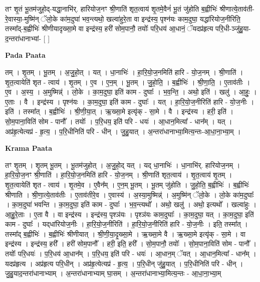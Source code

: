 \documentclass[17pt]{extarticle}
\begin{document}
तꣳ शृ॒तं भू॒तम॑जुहो॒द्-यद्धा॒नाभि॑र्. हारियोज॒नꣳ श्री॒णाति॑ शृत॒त्वाय॑ शृ॒तमे॒वैनं॑ भू॒तं जु॑होति ब॒ह्वीभिः॑ श्रीणात्ये॒ताव॑ती-रे॒वास्या॒-मुष्मि॑न् ॅलो॒के का॑म॒दुघा॑ भव॒न्त्यथो॒ खल्वा॑हुरे॒ता वा इन्द्र॑स्य॒ पृश्न॑यः काम॒दुघा॒ यद्धा॑रियोज॒नीरिति॒ तस्मा᳚द्-ब॒ह्वीभिः॑ श्रीणीयादृख्सा॒मे वा इन्द्र॑स्य॒ हरी॑ सोम॒पानौ॒ तयोः᳚ परि॒धय॑ आ॒धानं॒ ॅयदप्र॑हृत्य परि॒धी-ञ्जु॑हु॒या-द॒न्तरा॑धानाभ्यां- [  ] \newline

\textbf{Pada Paata} \newline

तम् । शृ॒तम् । भू॒तम् । अ॒जु॒हो॒त् । यत् । धा॒नाभिः॑ । हा॒रि॒यो॒ज॒नमिति॑ हारि - यो॒ज॒नम् । श्री॒णाति॑ । शृ॒त॒त्वायेति॑ शृत - त्वाय॑ । शृ॒तम् । ए॒व । ए॒न॒म् । भू॒तम् । जु॒हो॒ति॒ । ब॒ह्वीभिः॑ । श्री॒णा॒ति॒ । ए॒ताव॑तीः । ए॒व । अ॒स्य॒ । अ॒मुष्मिन्न्॑ । लो॒के । का॒म॒दुघा॒ इति॑ काम - दुघाः᳚ । भ॒व॒न्ति॒ । अथो॒ इति॑ । खलु॑ । आ॒हुः॒ । ए॒ताः । वै । इन्द्र॑स्य । पृश्न॑यः । का॒म॒दुघा॒ इति॑ काम - दुघाः᳚ । यत् । हा॒रि॒यो॒ज॒नीरिति॑ हारि - यो॒ज॒नीः । इति॑ । तस्मा᳚त् । ब॒ह्वीभिः॑ । श्री॒णी॒या॒त् । ऋ॒ख्सा॒मे इत्यृ॑क् - सा॒मे । वै । इन्द्र॑स्य । हरी॒ इति॑ । सो॒म॒पाना॒विति॑ सोम - पानौ᳚ । तयोः᳚ । प॒रि॒धय॒ इति॑ परि - धयः॑ । आ॒धान॒मित्या᳚ - धान᳚म् । यत् । अप्र॑हृ॒त्येत्यप्र॑ - हृ॒त्य॒ । प॒रि॒धीनिति॑ परि - धीन् । जु॒हु॒यात् । अ॒न्तरा॑धानाभ्या॒मित्य॒न्तः-आ॒धा॒ना॒भ्या॒म् ।  \newline


\textbf{Krama Paata} \newline

तꣳ शृ॒तम् । शृ॒तम् भू॒तम् । भू॒तम॑जुहोत् । अ॒जु॒हो॒द् यत् । यद् धा॒नाभिः॑ । धा॒नाभि॑र्. हारियोज॒नम् । हा॒रि॒यो॒ज॒नꣳ श्री॒णाति॑ । हा॒रि॒यो॒ज॒नमिति॑ हारि - यो॒ज॒नम् । श्री॒णाति॑ शृत॒त्वाय॑ । शृ॒त॒त्वाय॑ शृ॒तम् । शृ॒त॒त्वायेति॑ शृत - त्वाय॑ । शृ॒तमे॒व । ए॒वैन᳚म् । ए॒न॒म् भू॒तम् । भू॒तम् जु॑होति । जु॒हो॒ति॒ ब॒ह्वीभिः॑ । ब॒ह्वीभिः॑ श्रीणाति । श्री॒णा॒त्ये॒ताव॑तीः । ए॒ताव॑तीरे॒व । ए॒वास्य॑ । अ॒स्या॒मुष्मिन्न्॑ । अ॒मुष्मि॑न् ॅलो॒के । लो॒के का॑म॒दुघाः᳚ । का॒म॒दुघा॑ भवन्ति । का॒म॒दुघा॒ इति॑ काम - दुघाः᳚ । भ॒व॒न्त्यथो᳚ । अथो॒ खलु॑ । अथो॒ इत्यथो᳚ । खल्वा॑हुः । आ॒हु॒रे॒ताः । ए॒ता वै । वा इन्द्र॑स्य । इन्द्र॑स्य॒ पृश्ञ॑यः । पृश्ञ॑यः काम॒दुघाः᳚ । का॒म॒दुघा॒ यत् । का॒म॒दुघा॒ इति॑ काम - दुघाः᳚ । यद्‌धा॑रियोज॒नीः । हा॒रि॒यो॒ज॒नीरिति॑ । हा॒रि॒यो॒ज॒नीरिति॑ हारि - यो॒ज॒नीः । इति॒ तस्मा᳚त् । तस्मा᳚द् ब॒ह्वीभिः॑ । ब॒ह्वीभिः॑ श्रीणीयात् । 
श्री॒णी॒या॒दृ॒ख्सा॒मे । ऋ॒ख्सा॒मे वै । ऋ॒ख्सा॒मे इत्यृ॑क् - सा॒मे । वा इन्द्र॑स्य । इन्द्र॑स्य॒ हरी᳚ । हरी॑ सोम॒पानौ᳚ । हरी॒ इति॒ हरी᳚ । सो॒म॒पानौ॒ तयोः᳚ । सो॒म॒पाना॒विति॑ सोम - पानौ᳚ । तयोः᳚ परि॒धयः॑ । प॒रि॒धय॑ आ॒धान᳚म् । प॒रि॒धय॒ इति॑ परि - धयः॑ । आ॒धान॒म् ॅयत् । आ॒धान॒मित्या᳚ - धान᳚म् । यदप्र॑हृत्य । अप्र॑हृत्य परि॒धीन् । अप्र॑हृ॒त्येत्यप्र॑ - हृ॒त्य॒ । प॒रि॒धीन् जु॑हु॒यात् । प॒रि॒धीनिति॑ परि - धीन् । जु॒हु॒याद॒न्तरा॑धानाभ्याम् । अ॒न्तरा॑धानाभ्याम् घा॒सम् । अ॒न्तरा॑धानाभ्या॒मित्य॒न्तः - आ॒धा॒ना॒भ्या॒म् \newline
\end{document}

